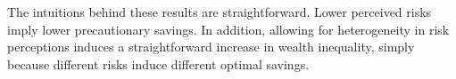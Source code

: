 The intuitions behind these results are straightforward. Lower perceived risks imply lower precautionary savings. In addition, allowing for heterogeneity in risk perceptions induces a straightforward increase in wealth inequality, simply because different risks induce different optimal savings. 








